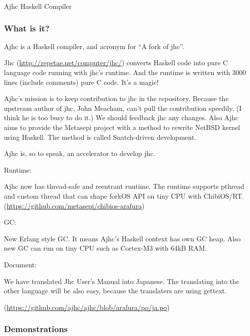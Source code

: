 \begin{hcarentry}{Ajhc Haskell Compiler}
\makeheader

\subsubsection*{What is it?}

Ajhc is a Haskell compiler, and acronym for ``A fork of jhc''.

Jhc (\url{http://repetae.net/computer/jhc/}) converts Haskell code into pure C language code running with jhc's runtime. And the runtime is written with 3000 lines (include comments) pure C code. It's a magic!

Ajhc's mission is to keep contribution to jhc in the repository. Because the upstream author of jhc, John Meacham, can't pull the contribution speedily. (I think he is too busy to do it.) We should feedback jhc any changes. Also Ajhc aims to provide the Metasepi project with a method to rewrite NetBSD kernel using Haskell. The method is called Snatch-driven development.

Ajhc is, so to speak, an accelerator to develop jhc.

\WhatsNew

\noindent Runtime:

Ajhc now has thread-safe and reentrant runtime.
The runtime supports pthread and custom thread
that can shape forkOS API on tiny CPU with ChibiOS/RT.
(\url{https://github.com/metasepi/chibios-arafura})

\Separate

\noindent GC:

New Erlang style GC. It means Ajhc's Haskell context has own GC heap.
Also new GC can run on tiny CPU such as Cortex-M3 with 64kB RAM.

\Separate

\noindent Document:

We have translated Jhc User's Manual into Japanese.
The translating into the other language will be also easy,
because the translaters are using gettext.

\noindent (\url{https://github.com/ajhc/ajhc/blob/arafura/po/ja.po})

\subsubsection*{Demonstrations}


\end{hcarentry}

